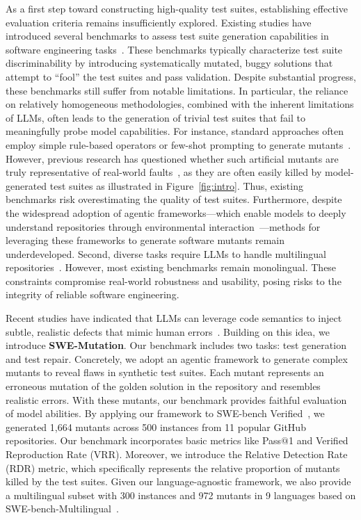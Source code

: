 \documentclass[11pt]{article}
\begin{document}
As a first step toward constructing high-quality test suites, establishing effective evaluation criteria remains insufficiently explored.
Existing studies have introduced several benchmarks to assess test suite generation capabilities in software engineering tasks~\citep{liu2023is}.
These benchmarks typically characterize test suite discriminability by introducing systematically mutated, buggy solutions that attempt to ``fool'' the test suites and pass validation.
Despite substantial progress, these benchmarks still suffer from notable limitations.
In particular, the reliance on relatively homogeneous methodologies, combined with the inherent limitations of LLMs, often leads to the generation of trivial test suites that fail to meaningfully probe model capabilities.
For instance, standard approaches often employ simple rule-based operators or few-shot prompting to generate mutants~\citep{chen2023codet}.
However, previous research has questioned whether such artificial mutants are truly representative of real-world faults~\citep{just2014are,jimenez2024swebench}, as they are often easily killed by model-generated test suites as illustrated in Figure~\ref{fig:intro}.
Thus, existing benchmarks risk overestimating the quality of test suites.
Furthermore, despite the widespread adoption of agentic frameworks---which enable models to deeply understand repositories through environmental interaction~\citep{yao2022react,yang2024sweagent,10.1145/3701551.3703537}---methods for leveraging these frameworks to generate software mutants remain underdeveloped.
Second, diverse tasks require LLMs to handle multilingual repositories~\citep{cassano2023multiple,zheng2023codegeex}.
However, most existing benchmarks remain monolingual.
These constraints compromise real-world robustness and usability, posing risks to the integrity of reliable software engineering.

Recent studies have indicated that LLMs can leverage code semantics to inject subtle, realistic defects that mimic human errors~\citep{yang2025testcaseeval,11082014}. Building on this idea, we introduce \textbf{SWE-Mutation}. Our benchmark includes two tasks: test generation and test repair. Concretely, we adopt an agentic framework to generate complex mutants to reveal flaws in synthetic test suites. Each mutant represents an erroneous mutation of the golden solution in the repository and resembles realistic errors. With these mutants, our benchmark provides faithful evaluation of model abilities. By applying our framework to SWE-bench Verified~\citep{openai2024swebench},
we generated 1,664 mutants across 500 instances from 11 popular GitHub repositories. Our benchmark incorporates basic metrics like Pass$@$1 and Verified Reproduction Rate (VRR). Moreover, we introduce the Relative Detection Rate (RDR) metric, which specifically represents the relative proportion of mutants killed by the test suites. Given our language-agnostic framework, we also provide a multilingual subset with 300 instances and 972 mutants in 9 languages based on SWE-bench-Multilingual~\citep{yang2025swesmith}. 
\end{document}
